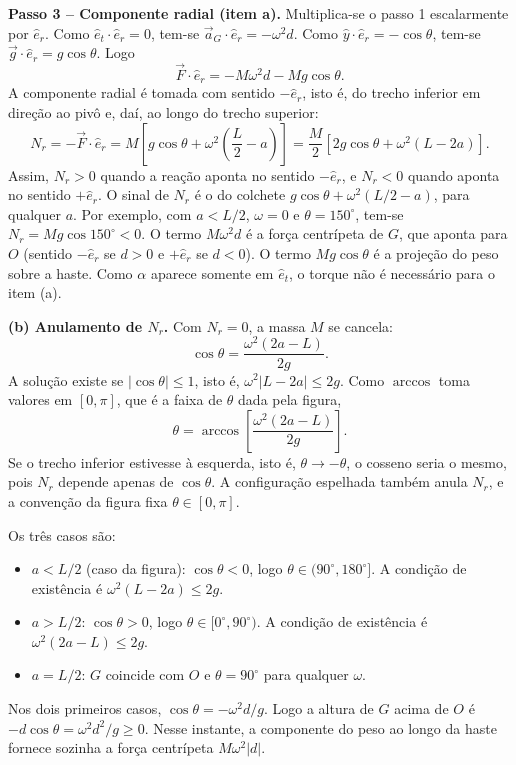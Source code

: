 \documentclass{article}%
\begin{document}
\textbf{Passo 3 -- Componente radial (item a).} Multiplica-se o passo 1 escalarmente por $\hat e_r$. Como $\hat e_t\cdot\hat e_r=0$, tem-se $\vec a_G\cdot\hat e_r=-\omega^2 d$. Como $\hat y\cdot\hat e_r=-\cos\theta$, tem-se $\vec g\cdot\hat e_r=g\cos\theta$. Logo
\[
\vec F\cdot\hat e_r=-M\omega^2 d-Mg\cos\theta.
\]
A componente radial é tomada com sentido $-\hat e_r$, isto é, do trecho inferior em direção ao pivô e, daí, ao longo do trecho superior:
\[
N_r=-\vec F\cdot\hat e_r=M\left[g\cos\theta+\omega^2\left(\frac{L}{2}-a\right)\right]=\frac{M}{2}\left[2g\cos\theta+\omega^2(L-2a)\right].
\]
Assim, $N_r>0$ quando a reação aponta no sentido $-\hat e_r$, e $N_r<0$ quando aponta no sentido $+\hat e_r$. O sinal de $N_r$ é o do colchete $g\cos\theta+\omega^2(L/2-a)$, para qualquer $a$. Por exemplo, com $a<L/2$, $\omega=0$ e $\theta=150^\circ$, tem-se $N_r=Mg\cos150^\circ<0$. O termo $M\omega^2 d$ é a força centrípeta de $G$, que aponta para $O$ (sentido $-\hat e_r$ se $d>0$ e $+\hat e_r$ se $d<0$). O termo $Mg\cos\theta$ é a projeção do peso sobre a haste. Como $\alpha$ aparece somente em $\hat e_t$, o torque não é necessário para o item (a).

\textbf{(b) Anulamento de $N_r$.} Com $N_r=0$, a massa $M$ se cancela:
\[
\cos\theta=\frac{\omega^2(2a-L)}{2g}.
\]
A solução existe se $|\cos\theta|\le 1$, isto é, $\omega^2|L-2a|\le 2g$. Como $\arccos$ toma valores em $[0,\pi]$, que é a faixa de $\theta$ dada pela figura,
\[
\theta=\arccos\left[\frac{\omega^2(2a-L)}{2g}\right].
\]
Se o trecho inferior estivesse à esquerda, isto é, $\theta\to-\theta$, o cosseno seria o mesmo, pois $N_r$ depende apenas de $\cos\theta$. A configuração espelhada também anula $N_r$, e a convenção da figura fixa $\theta\in[0,\pi]$.

Os três casos são:
\begin{itemize}
\item $a<L/2$ (caso da figura): $\cos\theta<0$, logo $\theta\in(90^\circ,180^\circ]$. A condição de existência é $\omega^2(L-2a)\le 2g$.
\item $a>L/2$: $\cos\theta>0$, logo $\theta\in[0^\circ,90^\circ)$. A condição de existência é $\omega^2(2a-L)\le 2g$.
\item $a=L/2$: $G$ coincide com $O$ e $\theta=90^\circ$ para qualquer $\omega$.
\end{itemize}
Nos dois primeiros casos, $\cos\theta=-\omega^2 d/g$. Logo a altura de $G$ acima de $O$ é $-d\cos\theta=\omega^2 d^2/g\ge 0$. Nesse instante, a componente do peso ao longo da haste fornece sozinha a força centrípeta $M\omega^2|d|$.
\end{document}
